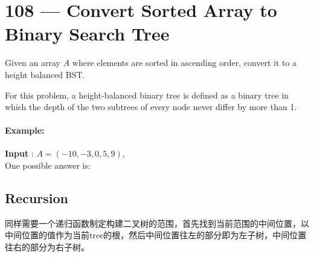 \section{108 --- Convert Sorted Array to Binary Search Tree}
Given an array $A$ where elements are sorted in ascending order, convert it to a height balanced BST.
\par
For this problem, a height-balanced binary tree is defined as a binary tree in which the depth of the two subtrees of every node never differ by more than 1.
\paragraph{Example:}
\begin{flushleft}
\textbf{Input} : $A = (-10,-3,0,5,9)$,
\\
One possible answer is:
\begin{figure}[H]
\end{figure}
 \end{flushleft}
 \subsection{Recursion}
 \begin{CJK*}{UTF8}{gbsn}
 同样需要一个递归函数制定构建二叉树的范围，首先找到当前范围的中间位置，以中间位置的值作为当前tree的根，然后中间位置往左的部分即为左子树，中间位置往右的部分为右子树。
\end{CJK*}
